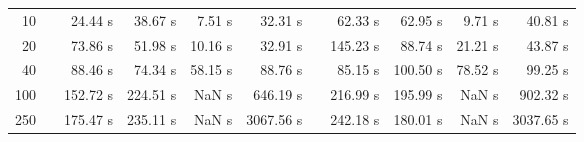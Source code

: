 {\begin{table}[h]
\begin{tabular}{rr rrrr r rrrr}
10 & & 24.44 s & 38.67 s & 7.51 s & 32.31 s && 62.33 s & 62.95 s & 9.71 s & 40.81 s \\ 
20 & & 73.86 s & 51.98 s & 10.16 s & 32.91 s && 145.23 s & 88.74 s & 21.21 s & 43.87 s \\ 
40 & & 88.46 s & 74.34 s & 58.15 s & 88.76 s && 85.15 s & 100.50 s & 78.52 s & 99.25 s \\ 
100 & & 152.72 s & 224.51 s &  NaN s & 646.19 s && 216.99 s & 195.99 s &  NaN s & 902.32 s \\ 
250 & & 175.47 s & 235.11 s &  NaN s & 3067.56 s && 242.18 s & 180.01 s &  NaN s & 3037.65 s \\ 
\hline 
\end{tabular} 
\end{table} 
} 

